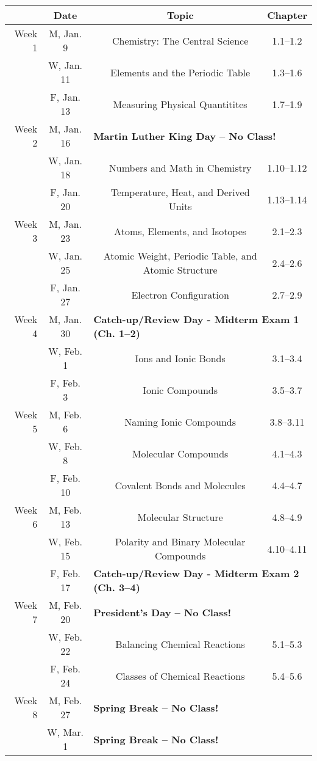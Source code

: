 \begin{tabular}{rcccc}
& Date && Topic & Chapter\\
\midrule
Week 1 & M, Jan. 9&& Chemistry: The Central Science & 1.1--1.2\\
& W, Jan. 11&& Elements and the Periodic Table & 1.3--1.6\\
& F, Jan. 13&& Measuring Physical Quantitites & 1.7--1.9\\
\midrule
Week 2 & M, Jan. 16& \multicolumn{3}{l}{\textbf{Martin Luther King Day -- No Class!}}\\
& W, Jan. 18&& Numbers and Math in Chemistry & 1.10--1.12\\
& F, Jan. 20&& Temperature, Heat, and Derived Units & 1.13--1.14\\
\midrule
Week 3 & M, Jan. 23&& Atoms, Elements, and Isotopes & 2.1--2.3\\
& W, Jan. 25&& Atomic Weight, Periodic Table, and Atomic Structure & 2.4--2.6\\
& F, Jan. 27&& Electron Configuration & 2.7--2.9\\
\midrule
Week 4 & M, Jan. 30& \multicolumn{3}{l}{\textbf{Catch-up/Review Day - Midterm Exam 1 (Ch. 1--2)}}\\
& W, Feb. 1&& Ions and Ionic Bonds & 3.1--3.4\\
& F, Feb. 3&& Ionic Compounds & 3.5--3.7\\
\midrule
Week 5 & M, Feb. 6&& Naming Ionic Compounds & 3.8--3.11\\
& W, Feb. 8&& Molecular Compounds & 4.1--4.3\\
& F, Feb. 10&& Covalent Bonds and Molecules & 4.4--4.7\\
\midrule
Week 6 & M, Feb. 13&& Molecular Structure & 4.8--4.9\\
& W, Feb. 15&& Polarity and Binary Molecular Compounds & 4.10--4.11\\
& F, Feb. 17& \multicolumn{3}{l}{\textbf{Catch-up/Review Day - Midterm Exam 2 (Ch. 3--4)}}\\
\midrule
Week 7 & M, Feb. 20& \multicolumn{3}{l}{\textbf{President's Day -- No Class!}}\\
& W, Feb. 22&& Balancing Chemical Reactions & 5.1--5.3\\
& F, Feb. 24&& Classes of Chemical Reactions & 5.4--5.6\\
\midrule
Week 8 & M, Feb. 27& \multicolumn{3}{l}{\textbf{Spring Break -- No Class!}}\\
& W, Mar. 1& \multicolumn{3}{l}{\textbf{Spring Break -- No Class!}}\\

\end{tabular}
